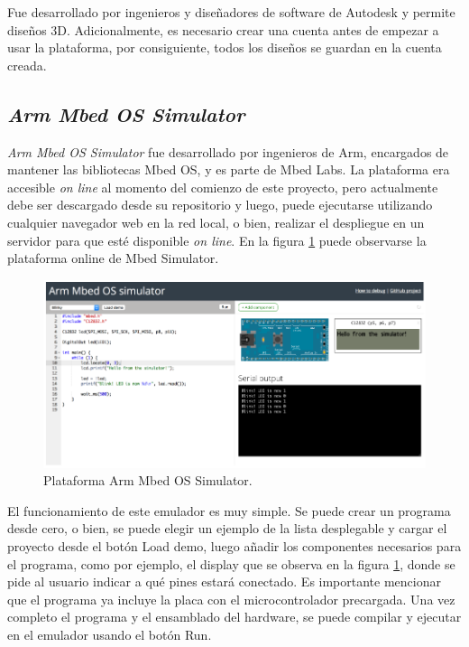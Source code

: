 Fue desarrollado por ingenieros y diseñadores de software de Autodesk \citep{Autodesk} y permite diseños 3D. Adicionalmente, es necesario crear una cuenta  antes de empezar a usar la plataforma, por consiguiente, todos los diseños se guardan en la cuenta creada. 

\subsection{\textit{Arm Mbed OS Simulator}}

\textit{Arm Mbed OS Simulator} \citep{ArmMbedSim} fue desarrollado por ingenieros de Arm, encargados de mantener las bibliotecas Mbed OS, \citep{ArmMbed} y es parte de Mbed Labs. La plataforma era accesible \textit{on line} al momento del comienzo de este proyecto, pero actualmente debe ser descargado desde su repositorio \citep{ArmMbedSimRepo} y luego, puede ejecutarse utilizando cualquier navegador web en la red local, o bien, realizar el despliegue en un servidor para que esté disponible \textit{on line}. En la figura \ref{fig:ArmMbed} puede observarse la plataforma online de Mbed Simulator.

\begin{figure}[ht]
	\centering
	\includegraphics[scale=.44]{./Figures/ArmMbed.png}
	\caption{Plataforma Arm Mbed OS Simulator.}
	\label{fig:ArmMbed}
\end{figure}

El funcionamiento de este emulador es muy simple. Se puede crear un programa desde cero, o bien, se puede elegir un ejemplo de la lista desplegable y cargar el proyecto desde el botón \textquotedbl Load demo\textquotedbl, luego añadir los componentes necesarios para el programa, como por ejemplo, el display que se observa en la figura \ref{fig:ArmMbed}, donde se pide al usuario indicar a qué pines estará conectado. Es importante mencionar que el programa ya incluye la placa con el microcontrolador precargada. Una vez completo el programa y el ensamblado del hardware, se puede compilar y ejecutar en el emulador usando el botón \textquotedbl Run\textquotedbl.

